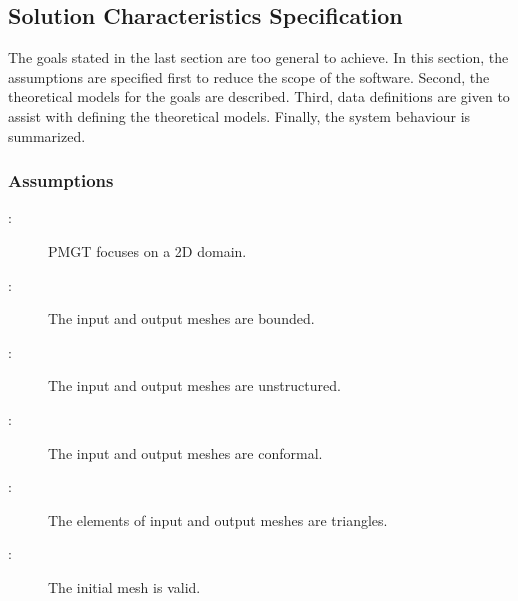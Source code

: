 \documentclass[12pt,titlepage]{article}
\begin{document}
\subsection{Solution Characteristics Specification\label{AreqSolution}}
The goals stated in the last section are too general to achieve. In this section, the assumptions are specified first to reduce the scope of the software. Second, the theoretical models for the goals are described. Third, data definitions are given to assist with defining the theoretical models. Finally, the system behaviour is summarized.     
\subsubsection{Assumptions}
\begin{description}
\item [ \atheassnum \label{aDimension}:]PMGT focuses on a 2D domain.
\item[ \atheassnum \label{aClosed}:]The input and output meshes are bounded.
\item [ \atheassnum \label{aUnstructured}:]The input and output meshes are unstructured.
\item[ \atheassnum \label{aConformal}:]The input and output meshes are conformal.
\item[ \atheassnum \label{aElmShape}:]The elements of input and output meshes are triangles.
\item[ \atheassnum \label{aValidMesh}:] The initial mesh is valid.
\end{description}
\end{document}
